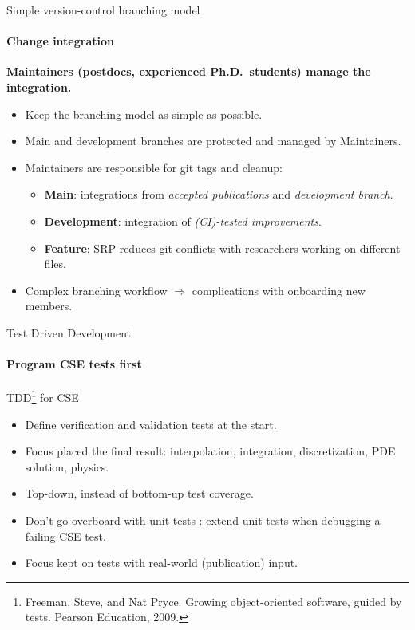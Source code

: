 \documentclass[
	aspectratio=169,%
	color={accentcolor=2d},
	logo=true,%
	colorframetitle=true,%
	]{tudabeamer}
\begin{document}
\begin{frame}{Simple version-control branching model} 
    \framesubtitle{Change integration}

        \vfill

        \textbf{Maintainers (postdocs, experienced Ph.D.\ students) manage the integration.} 

	\begin{itemize}
            \item Keep the branching model as simple as possible.  
            \item Main and development branches are protected and managed by Maintainers. 
            \item Maintainers are responsible for git tags and cleanup: 
            \begin{itemize}
                    \item \textbf{Main}: integrations from \emph{accepted publications} and \emph{development branch}. 
                    \item \textbf{Development}: integration of \emph{(CI)-tested improvements}. 
                    \item \textbf{Feature}: SRP reduces git-conflicts with researchers working on different files.
            \end{itemize}
            \item Complex branching workflow $\Rightarrow$ complications with onboarding new members.
	\end{itemize}

\end{frame}

\begin{frame}{Test Driven Development} 
    \framesubtitle{Program CSE tests first}
        \vfill


        TDD\footnote{Freeman, Steve, and Nat Pryce. Growing object-oriented software, guided by tests. Pearson Education, 2009.} for CSE
        \begin{itemize}
            \item Define verification and validation tests at the start.
            \item Focus placed the final result: interpolation, integration, discretization, PDE solution, physics. 
            \item Top-down, instead of bottom-up test coverage.
            \item Don't go overboard with unit-tests \faGraduationCap: extend unit-tests when debugging a failing CSE test.  
            \item Focus kept on tests with real-world (publication) input. 
        \end{itemize}

\end{frame}
\end{document}
